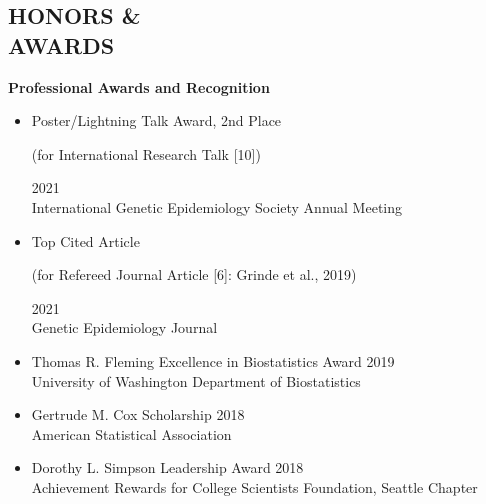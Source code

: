 \documentclass[margin]{res}
\begin{document}
\begin{resume}
\section{HONORS \& \\ AWARDS}

\textbf{Professional Awards and Recognition}
\begin{itemize}
\item Poster/Lightning Talk Award, 2nd Place \begin{footnotesize}(for International Research Talk [10])\end{footnotesize} \hfill 2021 \\
International Genetic Epidemiology Society Annual Meeting
\item Top Cited Article \begin{footnotesize}(for Refereed Journal Article [6]: Grinde et al., 2019)\end{footnotesize}  \hfill 2021 \\
Genetic Epidemiology Journal
\item Thomas R. Fleming Excellence in Biostatistics Award \hfill 2019 \\   
University of Washington Department of Biostatistics
\item Gertrude M. Cox Scholarship \hfill 2018 \\ American Statistical Association
\item Dorothy L. Simpson Leadership Award \hfill 2018 \\ Achievement Rewards for College Scientists Foundation, Seattle Chapter

\end{itemize}
\end{resume}
\end{document}
